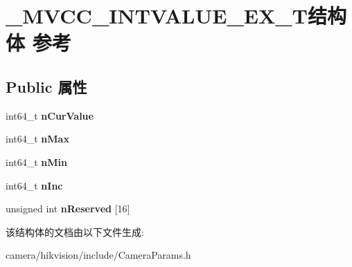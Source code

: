 \hypertarget{struct___m_v_c_c___i_n_t_v_a_l_u_e___e_x___t}{}\section{\+\_\+\+M\+V\+C\+C\+\_\+\+I\+N\+T\+V\+A\+L\+U\+E\+\_\+\+E\+X\+\_\+\+T结构体 参考}
\label{struct___m_v_c_c___i_n_t_v_a_l_u_e___e_x___t}
\subsection*{Public 属性}
\begin{DoxyCompactItemize}
\item 
\mbox{\label{struct___m_v_c_c___i_n_t_v_a_l_u_e___e_x___t_a844c702277129fbfbb3c204db236102a}} 
int64\+\_\+t {\bfseries n\+Cur\+Value}
\item 
\mbox{\label{struct___m_v_c_c___i_n_t_v_a_l_u_e___e_x___t_aebfc13ae40868c28b801d30bcff645f2}} 
int64\+\_\+t {\bfseries n\+Max}
\item 
\mbox{\label{struct___m_v_c_c___i_n_t_v_a_l_u_e___e_x___t_a14ad185c69aa175670bea0ca8abc61b9}} 
int64\+\_\+t {\bfseries n\+Min}
\item 
\mbox{\label{struct___m_v_c_c___i_n_t_v_a_l_u_e___e_x___t_aa777c930cf8fffae095c697ba9c1dfde}} 
int64\+\_\+t {\bfseries n\+Inc}
\item 
\mbox{\label{struct___m_v_c_c___i_n_t_v_a_l_u_e___e_x___t_aabfbeae728648ef82ca7f21f1ec31e60}} 
unsigned int {\bfseries n\+Reserved} \mbox{[}16\mbox{]}
\end{DoxyCompactItemize}


该结构体的文档由以下文件生成\+:\begin{DoxyCompactItemize}
\item 
camera/hikvision/include/Camera\+Params.\+h\end{DoxyCompactItemize}
